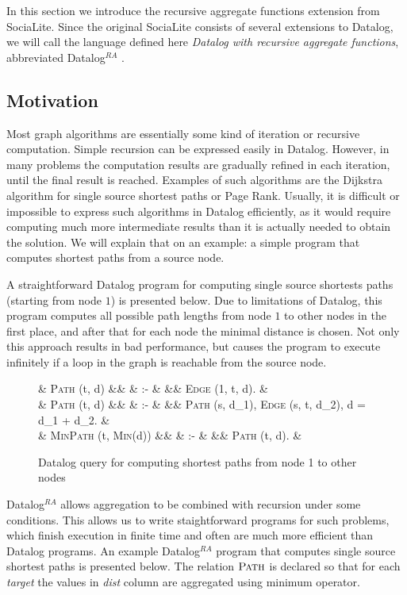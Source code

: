 \documentclass{pracamgr}
\theoremstyle{plain}
\theoremstyle{definition}
\theoremstyle{remark}
\newcommand{\datalogra}{Datalog$^{RA}$ }
\newcommand{\narrow}[1]{\begin{changemargin}{2cm}{2cm} #1 \end{changemargin}}
\begin{document}
In this section we introduce the recursive aggregate functions extension from SociaLite. Since the original SociaLite consists of several extensions to Datalog, we will call the language defined here \emph{Datalog with recursive aggregate functions}, abbreviated \datalogra.

\subsection{Motivation}
Most graph algorithms are essentially some kind of iteration or recursive computation. Simple recursion can be expressed easily in Datalog. However, in many problems the computation results are gradually refined in each iteration, until the final result is reached. Examples of such algorithms are the Dijkstra algorithm for single source shortest paths or Page Rank. Usually, it is difficult or impossible to express such algorithms in Datalog efficiently, as it would require computing much more intermediate results than it is actually needed to obtain the solution. We will explain that on an example: a simple program that computes shortest paths from a source node.

A straightforward Datalog program for computing single source shortests paths (starting from node $1$) is presented below. Due to limitations of Datalog, this program computes all possible path lengths from node $1$ to other nodes in the first place, and after that for each node the minimal distance is chosen. Not only this approach results in bad performance, but causes the program to execute infinitely if a loop in the graph is reachable from the source node.

\begin{figure}[h!]
\narrow{
  \begin{flalign*}
  & \textsc{Path} (t, d) &&  & :- & && \textsc{Edge} (1, t, d). & \\
  & \textsc{Path} (t, d) &&  & :- & && \textsc{Path} (s, d_1), \textsc{Edge} (s, t, d_2), d = d_1 + d_2. & \\
  & \textsc{MinPath} (t, \textsc{Min}(d)) &&  & :- & && \textsc{Path} (t, d). &
  \end{flalign*}
  \caption{Datalog query for computing shortest paths from node 1 to other nodes}
  \label{ex:ssspdatalog}
}
\end{figure}

\datalogra allows aggregation to be combined with recursion under some conditions. This allows us to write staightforward programs for such problems, which finish execution in finite time and often are much more efficient than Datalog programs. An example \datalogra program that computes single source shortest paths is presented below. The relation $\textsc{Path}$ is declared so that for each \textit{target} the values in \textit{dist} column are aggregated using minimum operator.
\end{document}
